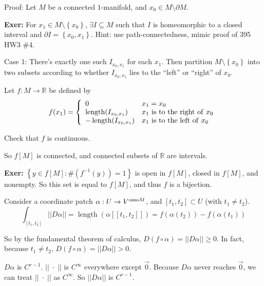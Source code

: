 \documentclass[10pt,letterpaper]{article}
\newcommand{\n}{\hfill\break}
\newcommand{\exer}[1]{\par\noindent\settowidth{\hangindent}{\textbf{Exer: }}\textbf{Exer: }#1\n}
\newcommand{\ptxt}[1]{\textrm{\textnormal{#1}}}
\newcommand{\set}[1]{\left\{#1\right\}}
\newcommand{\reals}{\mathbb{R}}
\newcommand{\R}{\reals}
\newcommand{\inv}{^{-1}}
\newcommand{\abs}[1]{\left|#1\right|}
\newcommand{\of}{\circ}
\newcommand{\norm}[1]{\abs{\abs{#1}}}
\DeclareMathOperator{\length}{length}
\begin{document}
\par\noindent Proof: Let $M$ be a connected $1$-manifold, and $x_{0}\in{}M\setminus\partial{}M$.\n

\exer{For $x_{1}\in{}M\setminus\set{x_{0}}$, $\exists{}I\subseteq{}M$ such that $I$ is homeomorphic to a closed interval and $\partial{}I=\set{x_{0},x_{1}}$.\n
Hint: use path-connectedness, mimic proof of 395 HW3 \#4.}

\par\noindent Case 1: There's exactly one such $I_{x_{0},x_{1}}$ for each $x_{1}$. Then partition $M\setminus\set{x_{0}}$ into two subsets according to whether $I_{x_{0},x_{1}}$ lies to the ``left'' or ``right'' of $x_{0}$.\n

\par\noindent Let $f:M\to\R$ be defined by
\[
f(x_{1})=\left\{\begin{array}{ll}0 & x_{1}=x_{0}\\ \length(I_{x_{0},x_{1}}) & x_{1}\ptxt{ is to the right of }x_{0}\\ -\length(I_{x_{0},x_{1}}) & x_{1}\ptxt{ is to the left of }x_{0}\end{array}\right.
\]

\par\noindent Check that $f$ is continuous.\n

\par\noindent So $f[M]$ is connected, and connected subsets of $\R$ are intervals.\n

\exer{$\set{y\in{}f[M]:\#(f\inv(y))=1}$ is open in $f[M]$, closed in $f[M]$, and nonempty.\n
So this set is equal to $f[M]$, and thus $f$ is a bijection.}

\par\noindent Consider a coordinate patch $\alpha:U\to{}V^{\ptxt{osso}M}$, and $[t_{1},t_{2}]\subset{}U$ (with $t_{1}\ne{}t_{2}$).\n
\[
\int_{[t_{1},t_{2}]}\norm{D\alpha}=\length(\alpha[[t_{1},t_{2}]])=f(\alpha(t_{2}))-f(\alpha(t_{1}))
\]

\par\noindent So by the fundamental theorem of calculus, $D(f\of\alpha)=\norm{D\alpha}\ge{}0$. In fact, because $t_{1}\ne{}t_{2}$, $D(f\of\alpha)=\norm{D\alpha}>0$.\n

\par\noindent $D\alpha$ is $C^{r-1}$. $\norm{\;\cdot\;}$ is $C^{\infty}$ everywhere except $\vec{0}$. Because $D\alpha$ never reaches $\vec{0}$, we can treat $\norm{\;\cdot\;}$ as $C^{\infty}$. So $\norm{D\alpha}$ is $C^{r-1}$.\n
\end{document}
